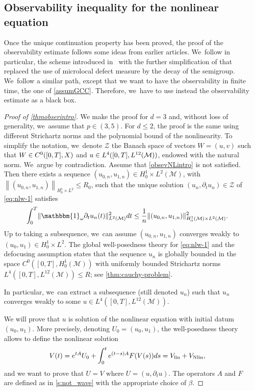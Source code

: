 \documentclass[10pt]{amsart}
\newcommand{\lin}{\textup{lin}}
\newcommand{\Nlin}{\textup{Nlin}}
\theoremstyle{definition}
\let\mc\mathcal
\newcommand{\M}{\mc{M}}
\providecommand{\norm}[1]{\lVert#1\rVert}
\newcommand\nor[2]{\left\|#1\right\|_{#2}}
\begin{document}
\subsection{Observability inequality for the nonlinear equation}
Once the unique continuation property has been proved, the proof of the observability estimate follows some ideas from earlier articles. We~follow in particular, the scheme introduced in~\cite{DLZ03} with the further simplification of \cite{JL13} that replaced the use of microlocal defect measure by the decay of the semigroup. We~follow a similar path, except that we want to have the observability in finite time, the one of \ref{assumGCC}. Therefore, we~have to use instead the observability estimate as a black box.
\begin{proof}[Proof of \cref{thmobserintro}]We make the proof for $d=3$ and, without loss of generality, we~assume that $p\in (3,5)$. For $d\leq 2$, the proof is the same using different Strichartz norms and the polynomial bound of the nonlinearity. To simplify the notation, we~denote $\mc{Z}$ the Banach space of vectors $W=(u,v)$ such that $W\in\nobreak C^0([0, T],X)$ and $u\in\nobreak L^{4}([0, T],L^{12}(\M))$, endowed with the natural norm. We~argue by contradiction. Assume that \eqref{obsevNLintro} is not satisfied. Then there exists a sequence \hbox{$(u_{0,n},u_{1,n})\in H^1_0\times L^2(\M)$}, with $\nor{(u_{0,n},u_{1,n})}{H^1_0\times L^2}\leq R_0$, such that the unique solution $(u_{n}, \partial_t u_{n})\in \mc{Z}$ of \eqref{eq:nlw-1} satisfies
\begin{align}\label{obsevNLintronegation}
\int_0^T \norm{\mathbbm{1}_\omega\partial_t u_{n}(t)}_{L^2(\M)}^2 dt
\leq \frac{1}{n}\norm{(u_{0,n},u_{1,n})}_{H_0^1(\M)\times L^2(\M)}^2.
\end{align}
Up to taking a subsequence, we~can assume $(u_{0,n},u_{1,n}) $ converges weakly to $(u_{0},u_{1})\in H^1_0\times L^2$. The global well-posedness theory for \eqref{eq:nlw-1} and the defocusing assumption states that the sequence $u_{n}$ is globally bounded in the space $C^{0}([0, T], H_0^1(\M))$ with uniformly bounded Strichartz norms $L^{4}([0, T], L^{12}(\M))\leq R$; see \cref{thm:cauchy-problem}.

In particular, we~can extract a subsequence (still denoted $u_{n}$) such that $u_{n}$ converges weakly to some $u\in L^{4}([0, T],L^{12}(\M))$.

We will prove that $u$ is solution of the nonlinear equation with initial datum $(u_{0},u_{1})$. More precisely, denoting $U_0=(u_{0},u_{1})$, the well-posedness theory allows to define the nonlinear solution
\begin{align*}
V(t)=e^{tA}U_0+\int_0^t e^{(t-s)A}F(V(s))ds=V_{\lin}+V_{\Nlin},
\end{align*}
and we want to prove that $U=V$ where $U=(u,\partial_{t }u)$. The operators $A$ and $F$ are defined as in \cref{s:not_wave} with the appropriate choice of $\beta$.


\end{proof}
\end{document}
